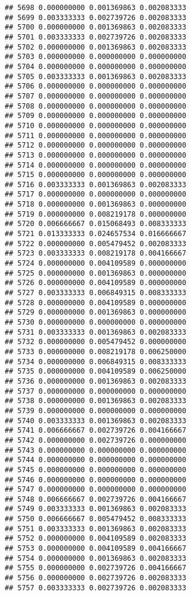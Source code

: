 \documentclass[
]{article}
\begin{document}
\begin{verbatim}
## 5698 0.000000000 0.001369863 0.002083333
## 5699 0.003333333 0.002739726 0.002083333
## 5700 0.000000000 0.001369863 0.002083333
## 5701 0.003333333 0.002739726 0.002083333
## 5702 0.000000000 0.001369863 0.002083333
## 5703 0.000000000 0.000000000 0.000000000
## 5704 0.000000000 0.000000000 0.000000000
## 5705 0.003333333 0.001369863 0.002083333
## 5706 0.000000000 0.000000000 0.000000000
## 5707 0.000000000 0.000000000 0.000000000
## 5708 0.000000000 0.000000000 0.000000000
## 5709 0.000000000 0.000000000 0.000000000
## 5710 0.000000000 0.000000000 0.000000000
## 5711 0.000000000 0.000000000 0.000000000
## 5712 0.000000000 0.000000000 0.000000000
## 5713 0.000000000 0.000000000 0.000000000
## 5714 0.000000000 0.000000000 0.000000000
## 5715 0.000000000 0.000000000 0.000000000
## 5716 0.003333333 0.001369863 0.002083333
## 5717 0.000000000 0.000000000 0.000000000
## 5718 0.000000000 0.001369863 0.000000000
## 5719 0.000000000 0.008219178 0.000000000
## 5720 0.006666667 0.015068493 0.008333333
## 5721 0.013333333 0.024657534 0.016666667
## 5722 0.000000000 0.005479452 0.002083333
## 5723 0.003333333 0.008219178 0.004166667
## 5724 0.000000000 0.004109589 0.000000000
## 5725 0.000000000 0.001369863 0.000000000
## 5726 0.000000000 0.004109589 0.000000000
## 5727 0.003333333 0.006849315 0.008333333
## 5728 0.000000000 0.004109589 0.000000000
## 5729 0.000000000 0.001369863 0.000000000
## 5730 0.000000000 0.000000000 0.000000000
## 5731 0.003333333 0.001369863 0.002083333
## 5732 0.000000000 0.005479452 0.000000000
## 5733 0.000000000 0.008219178 0.006250000
## 5734 0.000000000 0.006849315 0.008333333
## 5735 0.000000000 0.004109589 0.006250000
## 5736 0.000000000 0.001369863 0.002083333
## 5737 0.000000000 0.000000000 0.000000000
## 5738 0.000000000 0.001369863 0.002083333
## 5739 0.000000000 0.000000000 0.000000000
## 5740 0.003333333 0.001369863 0.002083333
## 5741 0.006666667 0.002739726 0.004166667
## 5742 0.000000000 0.002739726 0.000000000
## 5743 0.000000000 0.000000000 0.000000000
## 5744 0.000000000 0.000000000 0.000000000
## 5745 0.000000000 0.000000000 0.000000000
## 5746 0.000000000 0.000000000 0.000000000
## 5747 0.000000000 0.000000000 0.000000000
## 5748 0.006666667 0.002739726 0.004166667
## 5749 0.003333333 0.001369863 0.002083333
## 5750 0.006666667 0.005479452 0.008333333
## 5751 0.003333333 0.001369863 0.002083333
## 5752 0.000000000 0.004109589 0.002083333
## 5753 0.000000000 0.004109589 0.004166667
## 5754 0.000000000 0.001369863 0.002083333
## 5755 0.000000000 0.002739726 0.004166667
## 5756 0.000000000 0.002739726 0.002083333
## 5757 0.003333333 0.002739726 0.002083333

\end{verbatim}
\end{document}
